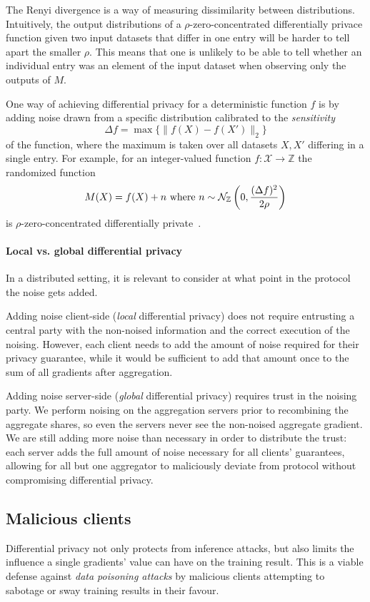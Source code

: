 \documentclass{article}
\begin{document}
The Renyi divergence is a way of measuring dissimilarity between distributions. Intuitively, the output distributions of a $\rho$-zero-concentrated differentially privace function given two input datasets that differ in one entry will be harder to tell apart the smaller $\rho$. This means that one is unlikely to be able to tell whether an individual entry was an element of the input dataset when observing only the outputs of $M$.

One way of achieving differential privacy for a deterministic function $f$ is by adding noise drawn from a specific distribution calibrated to the \textit{sensitivity} 
$$\Delta f=\max\{\|f(X)-f(X')\|_2\}$$
of the function, where the maximum is taken over all datasets $X,X'$ differing in a single entry. For example, for an integer-valued function $f:\mathcal X\rightarrow \mathbb Z$ the randomized function
$$M(X) = f(X) + n \textnormal{ where } n \sim \mathcal N_\mathbb{Z}\left(0,\frac{(\Delta f)^2}{2\rho}\right)$$
is $\rho$-zero-concentrated differentially private~\cite[Proposition 1.6]{DBLP:journals/corr/abs-2004-00010}.

\paragraph{Local vs. global differential privacy} In a distributed setting, it is relevant to consider at what point in the protocol the noise gets added.

Adding noise client-side (\textit{local} differential privacy) does not require entrusting a central party with the non-noised information and the correct execution of the noising. However, each client needs to add the amount of noise required for their privacy guarantee, while it would be sufficient to add that amount once to the sum of all gradients after aggregation.

Adding noise server-side (\textit{global} differential privacy) requires trust in the noising party. We perform noising on the aggregation servers prior to recombining the aggregate shares, so even the servers never see the non-noised aggregate gradient. We are still adding more noise than necessary in order to distribute the trust: each server adds the full amount of noise necessary for all clients' guarantees, allowing for all but one aggregator to maliciously deviate from protocol without compromising differential privacy.

\subsection{Malicious clients}
Differential privacy not only protects from inference attacks, but also limits the influence a single gradients' value can have on the training result. This is a viable defense against \textit{data poisoning attacks} by malicious clients attempting to sabotage or sway training results in their favour.
\end{document}
